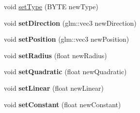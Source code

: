 \begin{DoxyCompactItemize}
\item 
void \hyperlink{class_light_abba7a3cf02bc097fcb8950e00c113aa8}{set\+Type} (B\+Y\+TE new\+Type)
\item 
void {\bfseries set\+Direction} (glm\+::vec3 new\+Direction)\hypertarget{class_light_a4eee07bdeb9540bf63f45546ffd6be1f}{}\label{class_light_a4eee07bdeb9540bf63f45546ffd6be1f}

\item 
void {\bfseries set\+Position} (glm\+::vec3 new\+Position)\hypertarget{class_light_ad35b48df38330b35a4ee1f8dd462acea}{}\label{class_light_ad35b48df38330b35a4ee1f8dd462acea}

\item 
void {\bfseries set\+Radius} (float new\+Radius)\hypertarget{class_light_a846c6f581c1091dc2052ef7b69fbabe2}{}\label{class_light_a846c6f581c1091dc2052ef7b69fbabe2}

\item 
void {\bfseries set\+Quadratic} (float new\+Quadratic)\hypertarget{class_light_a7ca67d1c0b6cbe86c7c33d08332a53fe}{}\label{class_light_a7ca67d1c0b6cbe86c7c33d08332a53fe}

\item 
void {\bfseries set\+Linear} (float new\+Linear)\hypertarget{class_light_aceb7b45cfe2548710f64a33043e973b7}{}\label{class_light_aceb7b45cfe2548710f64a33043e973b7}

\item 
void {\bfseries set\+Constant} (float new\+Constant)\hypertarget{class_light_a96ff8e8b388e8f8f2da5b2ef1de02e5d}{}\label{class_light_a96ff8e8b388e8f8f2da5b2ef1de02e5d}

\end{DoxyCompactItemize}
